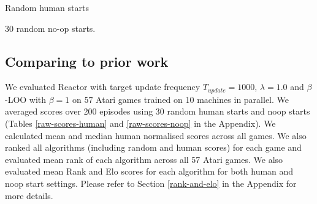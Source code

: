 \documentclass{article}
\begin{document}
\begin{table}[ht]
\centering
\hspace{-3cm}
\begin{minipage}{.55\textwidth}
\begin{center}
\begin{small}
\begin{sc}
\hfill
\end{sc}
\end{small}
\end{center}
\vspace{-0.2 in}
\caption{\small Random human starts}
\label{comparison-table1}
\end{minipage}
\begin{minipage}{.35\textwidth}
\begin{center}
\begin{small}
\begin{sc}
\hspace{2cm} 
\end{sc}
\hfill
\end{small}
\end{center}
\vspace{-0.2in}
\caption{\small 30 random no-op starts.}
\label{comparison-table3}
\end{minipage}
\end{table}
\subsection{Comparing to prior work}
We evaluated Reactor with target update frequency $T_{update}=1000$, 
$\lambda=1.0$ and $\beta$-LOO with $\beta=1$ on 
57 Atari games trained on 10 machines in parallel. 
We averaged scores over 200 episodes using 30 random human starts 
and noop starts (Tables \ref{raw-scores-human} and 
\ref{raw-scores-noop} in the Appendix). We calculated mean and 
median human normalised scores across all games. We also ranked 
all algorithms (including random and human scores) for each game and evaluated 
mean rank of each algorithm across all 57 Atari games. We also evaluated mean
Rank and Elo scores for each algorithm for both human and noop start settings. Please refer to Section 
\ref{rank-and-elo} in the Appendix for more details.
\end{document}
